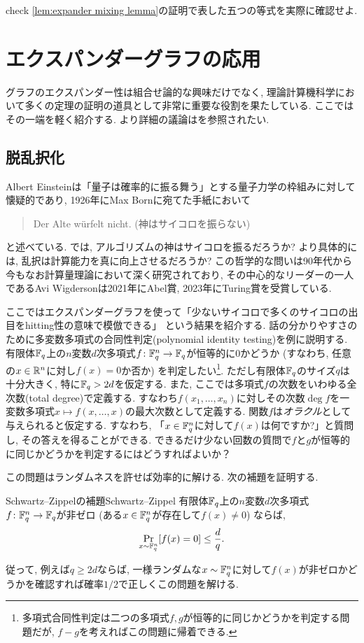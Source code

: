 \begin{exercise}{}{check}
    \cref{lem:expander mixing lemma}の証明で表した五つの等式を実際に確認せよ.
\end{exercise}


\section{エクスパンダーグラフの応用} \label{sec:expander graph application}
グラフのエクスパンダー性は組合せ論的な興味だけでなく,
理論計算機科学において多くの定理の証明の道具として非常に重要な役割を果たしている.
ここではその一端を軽く紹介する.
より詳細の議論は\cite{HLW06}を参照されたい.
%
\subsection{脱乱択化}
Albert Einsteinは「量子は確率的に振る舞う」とする量子力学の枠組みに対して懐疑的であり,
1926年にMax Bornに宛てた手紙において
\begin{quotation}
    Der Alte würfelt nicht. (神はサイコロを振らない)
\end{quotation}
と述べている.
では, アルゴリズムの神はサイコロを振るだろうか?
より具体的には, 乱択は計算能力を真に向上させるだろうか?
この哲学的な問いは90年代から今もなお計算量理論において深く研究されており,
その中心的なリーダーの一人であるAvi Wigdersonは2021年にAbel賞, 2023年にTuring賞を受賞している.

ここではエクスパンダーグラフを使って「少ないサイコロで多くのサイコロの出目をhitting性の意味で模倣できる」
という結果を紹介する.
話の分かりやすさのために多変数多項式の合同性判定(polynomial identity testing)を例に説明する.
有限体$\mathbb{F}_q$上の$n$変数$d$次多項式$f\colon \mathbb{F}_q^n\to \mathbb{F}_q$が恒等的に$0$かどうか (すなわち, 任意の$x\in\mathbb{R}^n$に対し$f(x)=0$か否か) を判定したい\footnote{多項式合同性判定は二つの多項式$f,g$が恒等的に同じかどうかを判定する問題だが, $f-g$を考えればこの問題に帰着できる.}.
ただし有限体$\mathbb{F}_q$のサイズ$q$は十分大きく, 特に$\mathbb{F}_q>2d$を仮定する.
また, ここでは多項式$f$の次数をいわゆる全次数(total degree)で定義する.
すなわち$f(x_1,\dots,x_n)$に対しその次数$\deg f$を一変数多項式$x \mapsto f(x,\dots,x)$の最大次数として定義する.
関数$f$は\emph{オラクル}として与えられると仮定する.
すなわち, 「$x\in\mathbb{F}_q^n$に対して$f(x)$は何ですか?」と質問し, その答えを得ることができる.
できるだけ少ない回数の質問で$f$と$g$が恒等的に同じかどうかを判定するにはどうすればよいか？

この問題はランダムネスを許せば効率的に解ける.
次の補題を証明する.
\begin{lemma}{Schwartz--Zippelの補題}{Schwartz--Zippel}
    有限体$\mathbb{F}_q$上の$n$変数$d$次多項式$f \colon \mathbb{F}_q^n \to \mathbb{F}_q$が非ゼロ (ある$x\in\mathbb{F}_q^n$が存在して$f(x)\neq 0$) ならば,
    \[ \Pr_{x \sim \Fq^n} \sbra*{ f(x) = 0} \le \frac{d}{q}. \]
\end{lemma}
従って, 例えば$q \ge 2d$ならば, 一様ランダムな$x\sim\mathbb{F}_q^n$に対して$f(x)$が非ゼロかどうかを確認すれば確率$1/2$で正しくこの問題を解ける.

